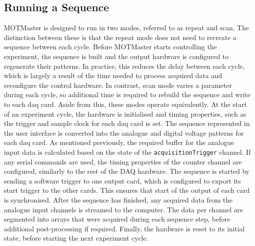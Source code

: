 \subsection{Running a Sequence}
MOTMaster is designed to run in two modes, referred to as repeat and scan. The distinction between these is that the repeat mode does not need to recreate a sequence between each cycle. Before MOTMaster starts controlling the experiment, the sequence is built and the output hardware is configured to regenerate their patterns. In practice, this reduces the delay between each cycle, which is largely a result of the time needed to process acquired data and reconfigure the control hardware. In contrast, scan mode varies a parameter during each cycle, so additional time is required to rebuild the sequence and write to each \ac{daq} card. Aside from this, these modes operate equivalently. At the start of an experiment cycle, the hardware is initialised and timing properties, such as the trigger and sample clock for each \ac{daq} card is set. The sequence represented in the user interface is converted into the analogue and digital voltage patterns for each \ac{daq} card. As mentioned previously, the required buffer for the analogue input data is calculated based on the state of the \verb|acquisitionTrigger| channel. If any serial commands are used, the timing properties of the counter channel are configured, similarly to the rest of the \ac{DAQ} hardware. The sequence is started by sending a software trigger to one output card, which is configured to export its start trigger to the other cards. This ensures that start of the output of each card is synchronised. After the sequence has finished, any acquired data from the analogue input channels is streamed to the computer. The data per channel are segmented into arrays that were acquired during each sequence step, before additional post-processing if required. Finally, the hardware is reset to its initial state, before starting the next experiment cycle.
